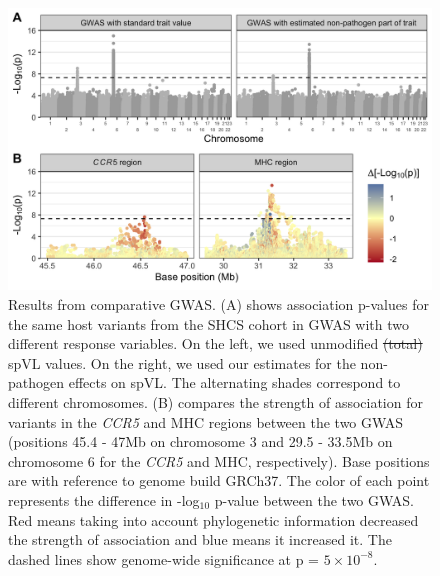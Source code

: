 \documentclass[12pt]{article} %
\providecommand{\DIFadd}[1]{{\protect\color{blue}\uwave{#1}}} %
\providecommand{\DIFdel}[1]{{\protect\color{red}\sout{#1}}}                      %
\providecommand{\DIFaddFL}[1]{\DIFadd{#1}} %
\providecommand{\DIFdelFL}[1]{\DIFdel{#1}} %
\providecommand{\DIFaddbeginFL}{} %
\providecommand{\DIFaddendFL}{} %
\providecommand{\DIFdelbeginFL}{} %
\providecommand{\DIFdelendFL}{} %
\newcommand{\DIFscaledelfig}{0.5}
\newlength{\DIFdelgraphicswidth} %
\newlength{\DIFdelgraphicsheight} %
\newcommand{\DIFaddincludegraphics}[2][]{{\color{blue}\fbox{\DIFOincludegraphics[#1]{#2}}}} %
\newcommand{\DIFdelincludegraphics}[2][]{%
\sbox{\DIFdelgraphicsbox}{\DIFOincludegraphics[#1]{#2}}%
\settoboxwidth{\DIFdelgraphicswidth}{\DIFdelgraphicsbox} %
\settoboxtotalheight{\DIFdelgraphicsheight}{\DIFdelgraphicsbox} %
\scalebox{\DIFscaledelfig}{%
\parbox[b]{\DIFdelgraphicswidth}{\usebox{\DIFdelgraphicsbox}\\[-\baselineskip] \rule{\DIFdelgraphicswidth}{0em}}\llap{\resizebox{\DIFdelgraphicswidth}{\DIFdelgraphicsheight}{%
\setlength{\unitlength}{\DIFdelgraphicswidth}%
\begin{picture}(1,1)%
\thicklines\linethickness{2pt} %
{\color[rgb]{1,0,0}\put(0,0){\framebox(1,1){}}}%
{\color[rgb]{1,0,0}\put(0,0){\line( 1,1){1}}}%
{\color[rgb]{1,0,0}\put(0,1){\line(1,-1){1}}}%
\end{picture}%
}\hspace*{3pt}}} %
} %
\DeclareRobustCommand{\DIFaddbeginFL}{\DIFOaddbeginFL \let\includegraphics\DIFaddincludegraphics} %
\DeclareRobustCommand{\DIFaddendFL}{\DIFOaddendFL \let\includegraphics\DIFOincludegraphics} %
\DeclareRobustCommand{\DIFdelbeginFL}{\DIFOdelbeginFL \let\includegraphics\DIFdelincludegraphics} %
\DeclareRobustCommand{\DIFdelendFL}{\DIFOaddendFL \let\includegraphics\DIFOincludegraphics} %
\begin{document}
\begin{doublespace}
\begin{figure}[H]
	\begin{center}
		\includegraphics[width=\linewidth]{figures/gwas_results}
		\caption{Results from comparative GWAS. (A) shows association p-values for the same host variants from the SHCS cohort in GWAS with two different response variables. On the left, we used unmodified \DIFdelbeginFL \DIFdelFL{(total) }\DIFdelendFL spVL values. On the right, we used our estimates for the non-pathogen effects on spVL. The alternating shades correspond to different chromosomes. (B) compares the strength of association for variants in the \emph{CCR5} and MHC regions between the two GWAS (positions 45.4 - 47Mb on chromosome 3 and 29.5 - 33.5Mb on chromosome 6 for the \emph{CCR5} and MHC, respectively). Base positions are with reference to genome build GRCh37. The color of each point represents the difference in -log$_{10}$ p-value between the two GWAS. Red means taking into account phylogenetic information decreased the strength of association and blue means it increased it. The dashed lines show genome-wide significance at p = \DIFdelbeginFL \DIFdelFL{$5 \times 10^{-8}$}\DIFdelendFL \DIFaddbeginFL \DIFaddFL{5x10$^{-8}$}\DIFaddendFL .}
		\label{fig:gwas-results}
	\end{center}
\end{figure}


\end{doublespace}
\end{document}
